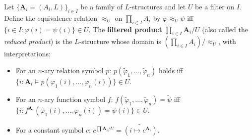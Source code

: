 Let $\{\mathbf{A}_i = (A_i, L)\}_{i \in I}$ be a family of $L$-structures and let $U$ be a filter on $I$. Define the equivalence relation $\approx_U$ on $\prod_{i \in I} A_i$ by $\varphi \approx_U \psi$ iff $\{i \in I : \varphi(i) = \psi(i)\} \in U$. The \textbf{filtered product} $\prod_{i \in I} \mathbf{A}_i / U$ (also called the \textit{reduced product}) is the $L$-structure whose domain is $(\prod_{i \in I} A_i) / {\approx_U}$, with interpretations:

\begin{itemize}
\item For an $n$-ary relation symbol $p$: $p(\tilde{\varphi}_1, \ldots, \tilde{\varphi}_n)$ holds iff $\{i : \mathbf{A}_i \models p(\varphi_1(i), \ldots, \varphi_n(i))\} \in U$.
\item For an $n$-ary function symbol $f$: $f(\tilde{\varphi}_1, \ldots, \tilde{\varphi}_n) = \tilde{\psi}$ iff $\{i : f^{\mathbf{A}_i}(\varphi_1(i), \ldots, \varphi_n(i)) = \psi(i)\} \in U$.
\item For a constant symbol $c$: $c^{\prod \mathbf{A}_i / U} = \widetilde{(i \mapsto c^{\mathbf{A}_i})}$.
\end{itemize}
